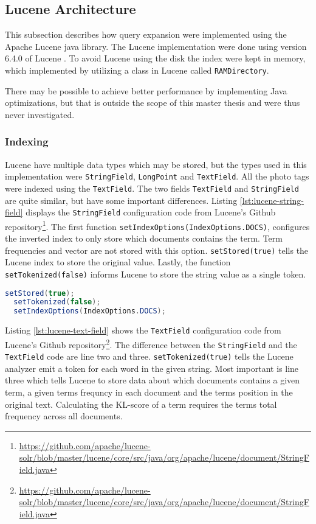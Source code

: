\subsection{Lucene Architecture}
This subsection describes how query expansion were implemented using the Apache Lucene java library.
The Lucene implementation were done using version 6.4.0 of Lucene \cite{lucene-documentation}.
To avoid Lucene using the disk the index were kept in memory,
which implemented by utilizing a class in Lucene called \texttt{RAMDirectory}.

There may be possible to achieve better performance by implementing Java optimizations,
but that is outside the scope of this master thesis and were thus never investigated.

\subsubsection{Indexing}
Lucene have multiple data types which may be stored,
but the types used in this implementation were \texttt{StringField}, \texttt{LongPoint} and \texttt{TextField}.
All the photo tags were indexed using the \texttt{TextField}.
The two fields \texttt{TextField} and \texttt{StringField} are quite similar,
but have some important differences.
Listing \ref{lst:lucene-string-field} displays the \texttt{StringField} configuration code from Lucene's Github repository\footnote{\url{https://github.com/apache/lucene-solr/blob/master/lucene/core/src/java/org/apache/lucene/document/StringField.java}}.
The first function \texttt{setIndexOptions(IndexOptions.DOCS)},
configures the inverted index to only store which documents contains the term.
Term frequencies and vector are not stored with this option.
\texttt{setStored(true)} tells the Lucene index to store the original value.
Lastly, the function \texttt{setTokenized(false)} informs Lucene to store the string value as a single token.

\begin{lstlisting}[language=java, caption={Lucene's \texttt{StringField} index configuration.}, label={lst:lucene-string-field}]
  setStored(true);
  setTokenized(false);
  setIndexOptions(IndexOptions.DOCS);
\end{lstlisting}

Listing \ref{lst:lucene-text-field} shows the \texttt{TextField} configuration code from Lucene's Github repository\footnote{\url{https://github.com/apache/lucene-solr/blob/master/lucene/core/src/java/org/apache/lucene/document/StringField.java}}.
The difference between the \texttt{StringField} and the \texttt{TextField} code are line two and three.
\texttt{setTokenized(true)} tells the Lucene analyzer emit a token for each word in the given string.
Most important is line three which tells Lucene to store data about which documents contains a given term,
a given terms frequncy in each document and the terms position in the original text.
Calculating the KL-score of a term requires the terms total frequency across all documents.

